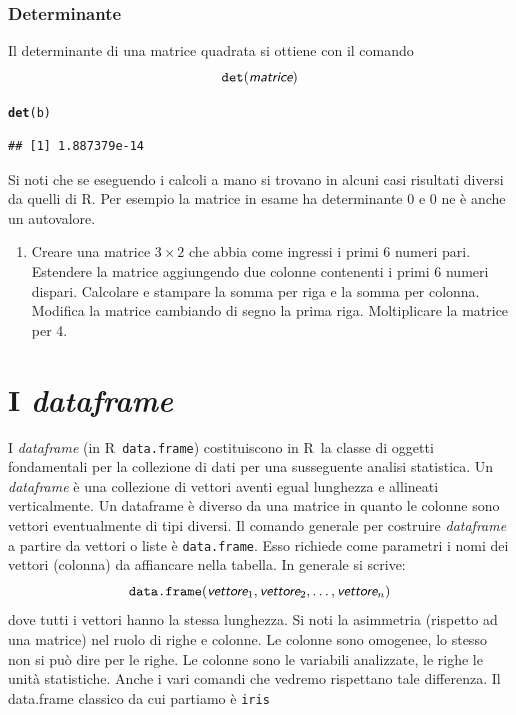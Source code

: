 \documentclass[onecolumn,12pt]{book}\usepackage[]{graphicx}\usepackage[]{color}
\makeatletter
\newcommand{\hlstd}[1]{\textcolor[rgb]{0.345,0.345,0.345}{#1}}%
\newcommand{\hlkwd}[1]{\textcolor[rgb]{0.737,0.353,0.396}{\textbf{#1}}}%
\newenvironment{kframe}{%
 \def\at@end@of@kframe{}%
 \ifinner\ifhmode%
  \def\at@end@of@kframe{\end{minipage}}%
  \begin{minipage}{\columnwidth}%
 \fi\fi%
 \def\FrameCommand##1{\hskip\@totalleftmargin \hskip-\fboxsep
 \colorbox{shadecolor}{##1}\hskip-\fboxsep
     \hskip-\linewidth \hskip-\@totalleftmargin \hskip\columnwidth}%
 \MakeFramed {\advance\hsize-\width
   \@totalleftmargin\z@ \linewidth\hsize
   \@setminipage}}%
 {\par\unskip\endMakeFramed%
 \at@end@of@kframe}
\newenvironment{knitrout}{}{} %
\newcommand{\varia}[1]{\textsl{\textsf{#1}}}
\newcommand{\rpr}{\textsf{R}~}
\makeatother
\begin{document}
\subsubsection{Determinante} Il determinante di una matrice quadrata si ottiene con il comando
\begin{equation}\texttt{det} (\varia{matrice})\end{equation}
\begin{knitrout}
\color{fgcolor}\begin{kframe}
\begin{alltt}
\hlkwd{det}\hlstd{(b)}
\end{alltt}
\begin{verbatim}
## [1] 1.887379e-14
\end{verbatim}
\end{kframe}
\end{knitrout}

Si noti che se eseguendo i calcoli a mano si trovano in alcuni casi risultati diversi da quelli di {\textsf R}. Per esempio la matrice in esame ha determinante 0 e 0 ne \`e anche un autovalore.
\begin{shaded}
 \begin{enumerate}
 \item{}Creare una matrice $3\times 2$ che abbia come ingressi i primi 6 numeri pari. Estendere la matrice aggiungendo due colonne contenenti i primi 6 numeri dispari. Calcolare e stampare la somma per riga e la somma per colonna. Modifica la matrice cambiando di segno la prima riga. Moltiplicare la matrice  per 4.
 \end{enumerate}
 \end{shaded}
 \section{I \emph{dataframe}}

I \emph{dataframe} (in \rpr  \texttt{data.frame}) costituiscono in \rpr la classe di oggetti fondamentali per la collezione di dati per una susseguente analisi statistica.
Un \emph{dataframe}  \`e una collezione di vettori aventi egual lunghezza e allineati verticalmente. Un dataframe \`e diverso da una matrice in quanto le colonne sono vettori eventualmente di tipi diversi. Il comando generale per costruire \emph{dataframe} a partire da vettori o liste
\`e \texttt{data.frame}.  Esso richiede come parametri i nomi dei vettori (colonna) da affiancare nella tabella. In generale si scrive:
\begin{equation*}\texttt{data.frame}(\varia{vettore}_1,\varia{vettore}_2, \ldots, \varia{vettore}_n)\end{equation*}
dove tutti i vettori hanno la stessa lunghezza.
Si noti la asimmetria  (rispetto ad una matrice) nel ruolo di righe e colonne. Le colonne sono omogenee, lo stesso non si pu\`o dire per le righe. Le colonne sono le variabili analizzate, le righe le unit\`a statistiche. Anche i vari comandi che vedremo rispettano tale differenza.
Il data.frame classico da cui partiamo è \texttt{iris}
\end{document}
